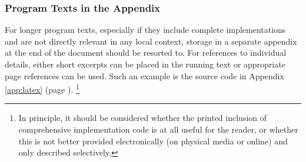 \subsubsection{Program Texts in the Appendix}

For longer program texts, especially if they include complete implementations
and are not directly relevant in any local context, storage in a separate
appendix at the end of the document should be resorted to. For references to
individual details, either short excerpts can be placed in the running text
or appropriate page references can be used. Such an example is the \latex
source code in Appendix \ref{app:latex} (page \pageref{app:latex}).%
\footnote{In principle, it should be considered whether the printed inclusion
of comprehensive implementation code is at all useful for the reader, or
whether this is not better provided electronically (on physical media or
online) and only described selectively.}

